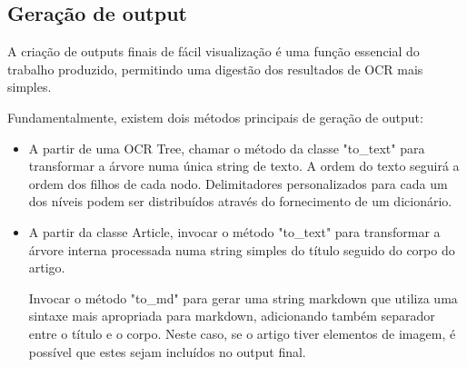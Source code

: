 \subsection{Geração de output}

A criação de outputs finais de fácil visualização é uma função essencial do trabalho produzido, permitindo uma digestão dos resultados de OCR mais simples.

Fundamentalmente, existem dois métodos principais de geração de output:

\begin{itemize}\setlength\itemsep{-0.3em}
	\item A partir de uma OCR Tree, chamar o método da classe "to\_text" para transformar a árvore numa única string de texto. A ordem do texto seguirá a ordem dos filhos de cada nodo. Delimitadores personalizados para cada um dos níveis podem ser distribuídos através do fornecimento de um dicionário.
	\item A partir da classe Article, invocar o método "to\_text" para transformar a árvore interna processada numa string simples do título seguido do corpo do artigo. 
	
	Invocar o método "to\_md" para gerar uma string markdown que utiliza uma sintaxe mais apropriada para markdown, adicionando também separador entre o título e o corpo. Neste caso, se o artigo tiver elementos de imagem, é possível que estes sejam incluídos no output final.
\end{itemize}






